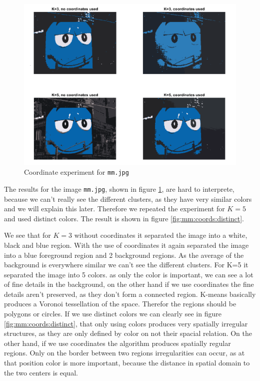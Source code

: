 \begin{figure}[h!]
\centering
\includegraphics[width = 0.8\linewidth]{figures/task2/mm_coordinates.png}
\caption{Coordinate experiment for \texttt{mm.jpg}}
\label{fig:mm:coords}
\end{figure}

The results for the image \texttt{mm.jpg}, shown in figure \ref{fig:mm:coords}, are hard to interprete, because we can't really see the different clusters, as they have very similar colors and we will explain this later. Therefore we repeated the experiment for $K=5$ and used distinct colors. The result is shown in figure \ref{fig:mm:coords:distinct}. 

We see that for $K=3$ without coordinates it separated the image into a white, black and blue region. With the use of coordinates it again separated the image into a blue foreground region and 2 background regions. As the average of the background is everywhere similar we can't see the different clusters. For K=5 it separated the image into 5 colors. as only the color is important, we can see a lot of fine details in the background, on the other hand if we use coordinates the fine details aren't preserved, as they don't form a connected region. K-means basically produces a Voronoi tessellation of the space. Therefor the regions should be polygons or circles. If we use distinct colors we can clearly see in figure \ref{fig:mm:coords:distinct}, that only using colors produces very spatially irregular structures, as they are only defined by color on not their spacial relation. On the other hand, if we use coordinates the algorithm produces spatially regular regions. Only on the border between two regions irregularities can occur, as at that position color is more important, because the distance in spatial domain to the two centers is equal.

